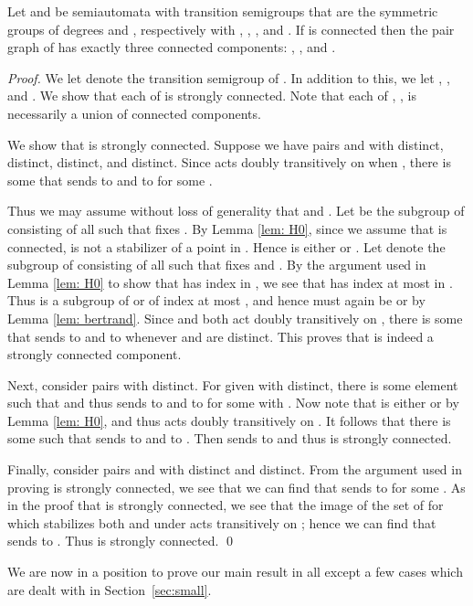 \documentclass{llncs}
\begin{document}
 
\begin{lemma} 
\label{lem:main}
Let  and  be 
semiautomata with transition semigroups  that are the symmetric groups  of degrees  and , respectively with , , , and .  If  is connected then the pair graph of  has exactly three connected components:
, , and 
. 

\end{lemma}
\begin{proof}
We let  denote the transition semigroup of .  In addition to this, we let 
, , and 
.  We show that each of  is strongly connected.  Note that each of , ,  is necessarily a union of connected components. 


We show that  is strongly connected.  Suppose we have pairs  and  with  distinct,  distinct,  distinct, and  distinct.  Since  acts doubly transitively on  when ,  there is some  that sends  to  and  to  for some .

Thus we may assume without loss of generality that  and .  Let  be the subgroup of  consisting of all  such that  fixes .  By Lemma \ref{lem: H0},  since we assume that  is connected,
 is not a stabilizer of a point in .
Hence  is either  or .  
Let  denote the subgroup of  consisting of all  such that  fixes  and .  
By the argument used in Lemma \ref{lem: H0} to show that  has index  in , we see that  has index at most  in .  
Thus  is a subgroup of  or  of index at most , and hence must again be  or  by Lemma \ref{lem: bertrand}.  
Since  and  both act doubly transitively on , there is some  that sends  to  and  to  whenever  and  are distinct.  This proves that  is indeed a strongly connected component.

Next, consider pairs  with  distinct.  For given  with  distinct, there is some element  such that  and thus  sends
 to  and  to  for some  with .  Now note that  is either  or  by Lemma \ref{lem: H0}, and thus acts doubly transitively on .  It follows that there is some  such that
 sends  to  and  to .  Then  sends  to  and thus  is strongly connected.

Finally, consider pairs  and  with  distinct and  distinct.  From the argument used in proving  is strongly connected, we see that we can find  that sends
 to  for some .  As in the proof that  is strongly connected,  we see that the image of the set of  for which  stabilizes both  and  under  acts transitively on ; hence we can find  that  sends  to .  Thus  is strongly connected.
\qed
\end{proof} 

We are now in a position to prove our main result in all except a few cases which are dealt with in Section~\ref{sec:small}.
\end{document}
